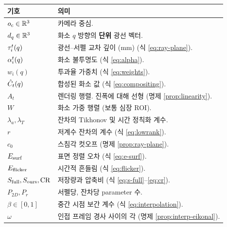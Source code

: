 \begin{longtable}{@{}lp{10.2cm}@{}}
\toprule
기호 & 의미 \\
\midrule
\endhead
$o_c \in \mathbb{R}^3$ & 카메라 중심. \\
$d_q \in \mathbb{R}^3$ & 화소 $q$ 방향의 \textbf{단위} 광선 벡터. \\
$\tau^t_i(q)$ & 광선--서펠 교차 깊이 (mm) (식 \eqref{eq:ray-plane}). \\
$\alpha^t_i(q)$ & 화소 불투명도 (식 \eqref{eq:alpha}). \\
$w_i(q)$ & 투과율 가중치 (식 \eqref{eq:weights}). \\
$\hat{C}_t(q)$ & 합성된 화소 값 (식 \eqref{eq:compositing}). \\
$A_t$ & 렌더링 행렬. 진폭에 대해 선형 (명제 \ref{prop:linearity}). \\
$W$ & 화소 가중 행렬 (보통 심장 ROI). \\
$\lambda_a, \lambda_T$ & 잔차의 Tikhonov 및 시간 정칙화 계수. \\
$r$ & 저계수 잔차의 계수 (식 \eqref{eq:lowrank}). \\
$c_0$ & 스침각 컷오프 (명제 \ref{prop:ray-plane}). \\
$E_{\mathrm{surf}}$ & 표면 정렬 오차 (식 \eqref{eq:e-surf}). \\
$E_{\mathrm{flicker}}$ & 시간적 흔들림 (식 \eqref{eq:flicker}). \\
$S_{\mathrm{full}}, S_{\mathrm{ours}}, \mathrm{CR}$ & 저장량과 압축비 (식 \eqref{eq:s-full}--\eqref{eq:cr}). \\
$P_{2D}, P_r$ & 서펠당, 잔차당 parameter 수. \\
$\beta \in [0,1]$ & 중간 시점 보간 계수 (식 \eqref{eq:interpolation}). \\
$\omega$ & 인접 프레임 경사 사이의 각 (명제 \ref{prop:interp-eikonal}). \\
\bottomrule
\end{longtable}
